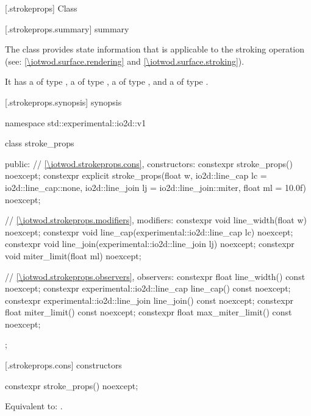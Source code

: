 
 [\iotwod.strokeprops] {Class }

 [\iotwod.strokeprops.summary] { summary}

\pnum
The  class provides state information that is applicable to the stroking operation (see: \ref{\iotwod.surface.rendering} and \ref{\iotwod.surface.stroking}).

\pnum
It has a  of type , a  of type , a  of type , and a  of type .

 [\iotwod.strokeprops.synopsis] { synopsis}

\begin{codeblock}
namespace std::experimental::io2d::v1 {
  class stroke_props {
  public:
    // \ref{\iotwod.strokeprops.cons}, constructors:
    constexpr stroke_props() noexcept;
    constexpr explicit stroke_props(float w,
      io2d::line_cap lc = io2d::line_cap::none,
      io2d::line_join lj = io2d::line_join::miter,
      float ml = 10.0f) noexcept;

    // \ref{\iotwod.strokeprops.modifiers}, modifiers:
    constexpr void line_width(float w) noexcept;
    constexpr void line_cap(experimental::io2d::line_cap lc) noexcept;
    constexpr void line_join(experimental::io2d::line_join lj) noexcept;
    constexpr void miter_limit(float ml) noexcept;
    
    // \ref{\iotwod.strokeprops.observers}, observers:
    constexpr float line_width() const noexcept;
    constexpr experimental::io2d::line_cap line_cap() const noexcept;
    constexpr experimental::io2d::line_join line_join() const noexcept;
    constexpr float miter_limit() const noexcept;
    constexpr float max_miter_limit() const noexcept;
  };
}
\end{codeblock}

 [\iotwod.strokeprops.cons] { constructors}

%
\begin{itemdecl}
constexpr stroke_props() noexcept;
\end{itemdecl}
\begin{itemdescr}
\pnum
\effects
Equivalent to: .
\end{itemdescr}

